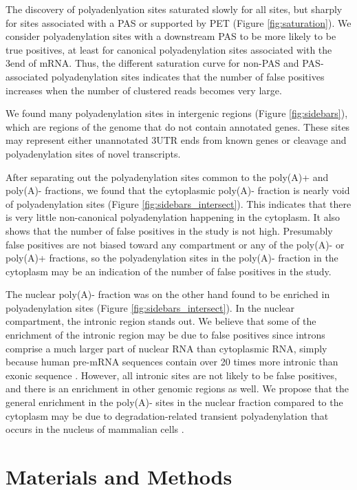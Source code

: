 The discovery of polyadenlyation sites saturated slowly for all sites, but
sharply for sites associated with a PAS or supported by PET (Figure
\ref{fig:saturation}). We consider polyadenylation sites with a downstream PAS
to be more likely to be true positives, at least for canonical polyadenylation
sites associated with the 3\p end of mRNA. Thus, the different saturation curve
for non-PAS and PAS-associated polyadenylation sites indicates that the number
of false positives increases when the number of clustered reads becomes very
large. 

We found many polyadenylation sites in intergenic regions (Figure
\ref{fig:sidebars}), which are regions of the genome that do not contain
annotated genes. These sites may represent either unannotated 3\p UTR
ends from known genes or cleavage and polyadenylation sites of novel
transcripts.

After separating out the polyadenylation sites common to the poly(A)+ and
poly(A)- fractions, we found that the cytoplasmic poly(A)- fraction is nearly
void of polyadenylation sites (Figure \ref{fig:sidebars_intersect}). This
indicates that there is very little non-canonical polyadenylation happening in
the cytoplasm. It also shows that the number of false positives in the study is
not high. Presumably false positives are not biased toward any compartment or
any of the poly(A)- or poly(A)+ fractions, so the polyadenylation sites in the
poly(A)- fraction in the cytoplasm may be an indication of the number of false
positives in the study. 

The nuclear poly(A)- fraction was on the other hand found to be enriched in
polyadenylation sites (Figure \ref{fig:sidebars_intersect}). In the nuclear
compartment, the intronic region stands out. We believe that some of the
enrichment of the intronic region may be due to false positives since introns
comprise a much larger part of nuclear RNA than cytoplasmic RNA, simply because
human pre-mRNA sequences contain over 20 times more intronic than exonic
sequence \cite{venter_sequence_2001}. However, all intronic sites are not
likely to be false positives, and there is an enrichment in other genomic
regions as well. We propose that the general enrichment in the poly(A)- sites
in the nuclear fraction compared to the cytoplasm may be due to
degradation-related transient polyadenylation that occurs in the nucleus of
mammalian cells \cite{lemay_nuclear_2010, lacava_rna_2005, wyers_cryptic_2005}.

\section{Materials and Methods}
